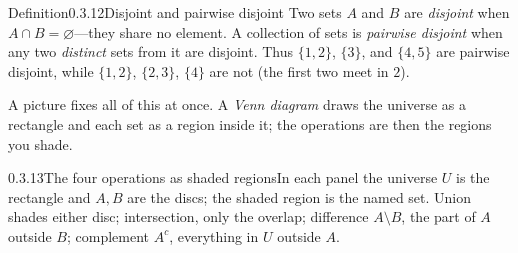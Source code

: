 \documentclass[main.tex]{subfiles}
\begin{document}
\begin{Obj}{Definition}{0.3.12}{Disjoint and pairwise disjoint}
Two sets $A$ and $B$ are \emph{disjoint} when $A\cap B=\varnothing$---they share no element. A
collection of sets is \emph{pairwise disjoint} when any two \emph{distinct} sets from it are disjoint.
Thus $\{1,2\}$, $\{3\}$, and $\{4,5\}$ are pairwise disjoint, while $\{1,2\}$, $\{2,3\}$, $\{4\}$ are
not (the first two meet in $2$).
\end{Obj}

\noindent A picture fixes all of this at once. A \emph{Venn diagram} draws the universe as a
rectangle and each set as a region inside it; the operations are then the regions you shade.

\begin{Fig}{0.3.13}{The four operations as shaded regions}{In each panel the universe $U$ is the
rectangle and $A,B$ are the discs; the shaded region is the named set. Union shades either disc;
intersection, only the overlap; difference $A\setminus B$, the part of $A$ outside $B$; complement
$A^{c}$, everything in $U$ outside $A$.}
\end{Fig}
\end{document}
